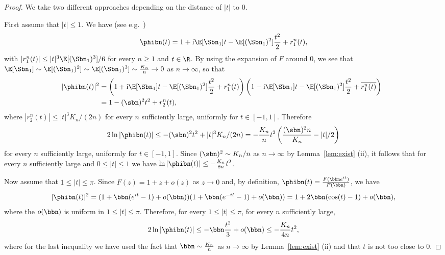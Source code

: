 \begin{proof}
We take two different approaches depending on the distance of $|t|$ to $0$.

First assume that $|t| \leq 1$. We have (see e.g.~\cite[Lemma 3.3.7]{Dur10})
\[\phibn(t)=1+\textrm{i}\E[\Sbn_{1}]t- \E[(\Sbn_{1})^{2}] \frac{t^{2}}{2}+r^{n}_{1}(t),\]
with $|r^{n}_{1}(t)| \leq |t|^{3} \E[(\Sbn_{1})^{3}]/6$ for every $n \geq 1$ and $t \in \R$. By using the expansion of $F$ around $0$, we see that $ \E[\Sbn_{1}] \sim \E[(\Sbn_{1})^{2}] \sim \E[(\Sbn_{1})^{3}] \sim \frac{K_{n}}{n} \rightarrow 0$ as $n \rightarrow \infty$, so that
\begin{align*}
  \hspace{ -2mm} |\phibn(t)|^{2} &= \left( 1+\textrm{i}\E[\Sbn_{1}]t- \E[(\Sbn_{1})^{2}] \frac{t^{2}}{2}+r^{n}_{1}(t) \right) \left( 1-\textrm{i}\E[\Sbn_{1}]t- \E[(\Sbn_{1})^{2}] \frac{t^{2}}{2}+\overline{r^{n}_{1}(t)} \right)\\
&= 1 - (\sbn)^{2} t^{2}+r^{n}_{2}(t),
\end{align*}
where $|r^{n}_{2}(t)| \leq  |t|^{3} K_{n}/(2n)$ for every $n$ sufficiently large, uniformly for $t \in [-1,1]$.
Therefore
\[ 2 \ln |\phibn(t)| \leq - (\sbn)^{2} t^{2}+ |t|^{3} K_{n}/(2n)= - \frac{K_{n}}{n} t^{2} \left(  \frac{(\sbn)^{2} n}{K_{n}}-|t|/2 \right)
\]
for every $n$ sufficiently large, uniformly for $t \in [-1,1]$.
Since $(\sbn)^{2} \sim K_{n}/n$ as $n \rightarrow \infty$ by Lemma~\ref{lem:exist} (ii), it follows that for every $n$ sufficiently large and $0 \leq |t| \leq 1$ we have $ \ln | \phibn (t)| \leq -  \frac{K_{n}}{ 8n} t^{2}$.

Now assume that $1 \leq |t| \leq \pi$. Since $F(z)=1+z+o(z)$ as $z \rightarrow 0$ and, by definition, $\phibn(t)=\tfrac{F( \bbn e^{it})}{F(\bbn)}$,
we have
\[|\phibn(t)|^{2}=(1+\bbn(e^{it}-1)+o(\bbn))(1+\bbn(e^{-it}-1)+o(\bbn))=1+2\bbn(\cos(t)-1)+o(\bbn),\]
where the $o(\bbn)$ is uniform in $1\leq |t| \leq \pi$.
Therefore, for every $1 \leq |t| \leq \pi$, for every $n$ sufficiently large,
\[ 2 \ln |\phibn(t)| \leq - \bbn \frac{t^{2}}{3}+o(\bbn) \leq - \frac{K_{n}}{4n} t^{2},\]
where for the last inequality we have used the fact that $\bbn \sim \frac{K_{n}}{n}$ as $n \rightarrow \infty$ by Lemma~\ref{lem:exist} (ii) and that $t$ is not too close to $0$.
\end{proof}





